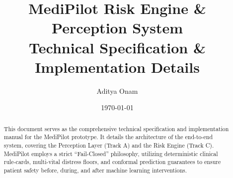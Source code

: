 \documentclass[11pt,a4paper]{article}
\title{\textbf{MediPilot Risk Engine \& Perception System}\\Technical Specification \& Implementation Details}
\author{Aditya Onam}
\date{\today}
\begin{document}
\maketitle

\begin{abstract}
This document serves as the comprehensive technical specification and implementation manual for the MediPilot prototype. It details the architecture of the end-to-end system, covering the Perception Layer (Track A) and the Risk Engine (Track C). MediPilot employs a strict ``Fail-Closed'' philosophy, utilizing deterministic clinical rule-cards, multi-vital distress floors, and conformal prediction guarantees to ensure patient safety before, during, and after machine learning interventions.
\end{abstract}

\tableofcontents
\newpage







\end{document}
